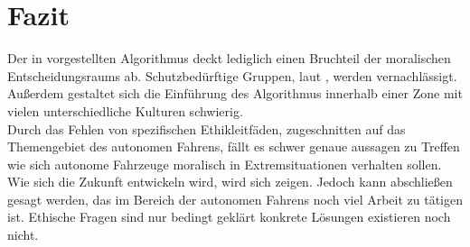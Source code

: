 \section{Fazit}
\label{sec:fazit}

Der in \citeauthor{votingBasedSystem} vorgestellten Algorithmus deckt lediglich einen Bruchteil der moralischen Entscheidungsraums ab. Schutzbedürftige Gruppen, laut \cite{ec2019ethics}, werden vernachlässigt. Außerdem gestaltet sich die Einführung des Algorithmus innerhalb einer Zone mit vielen unterschiedliche Kulturen schwierig.\\

Durch das Fehlen von spezifischen Ethikleitfäden, zugeschnitten auf das Themengebiet des autonomen Fahrens, fällt es schwer genaue aussagen zu Treffen wie sich autonome Fahrzeuge moralisch in Extremsituationen verhalten sollen.\\

Wie sich die Zukunft entwickeln wird, wird sich zeigen. Jedoch kann abschließen gesagt werden, das im Bereich der autonomen Fahrens noch viel Arbeit zu tätigen ist. Ethische Fragen sind nur bedingt geklärt konkrete Lösungen existieren noch nicht.